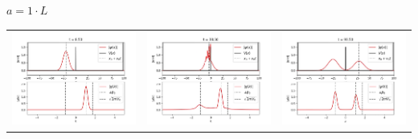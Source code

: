 \documentclass[11pt]{article}
\begin{document}
$a = 1\cdot L$ \\
\begin{tabular}{ccc}
	\includegraphics[scale=0.2]{sh_1_8_50} & 
	\includegraphics[scale=0.2]{sh_1_38_50} & 
	\includegraphics[scale=0.2]{sh_1_93_50} \\
\end{tabular}
\end{document}
